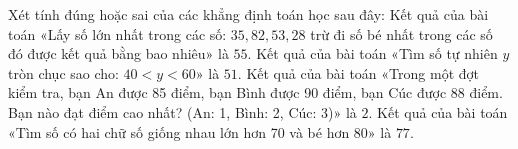\begin{ex} %
Xét tính đúng hoặc sai của các khẳng định toán học sau đây:
\choiceTF
{Kết quả của bài toán «Lấy số lớn nhất trong các số: $35, 82, 53, 28$ trừ đi số bé nhất trong các số đó được kết quả bằng bao nhiêu» là $55$.}
{Kết quả của bài toán «Tìm số tự nhiên $y$ tròn chục sao cho: $40 < y < 60$» là $51$.}
{\True Kết quả của bài toán «Trong một đợt kiểm tra, bạn An được 85 điểm, bạn Bình được 90 điểm, bạn Cúc được 88 điểm. Bạn nào đạt điểm cao nhất? (An: 1, Bình: 2, Cúc: 3)» là $2$.}
{\True Kết quả của bài toán «Tìm số có hai chữ số giống nhau lớn hơn 70 và bé hơn 80» là $77$.}
\end{ex}

